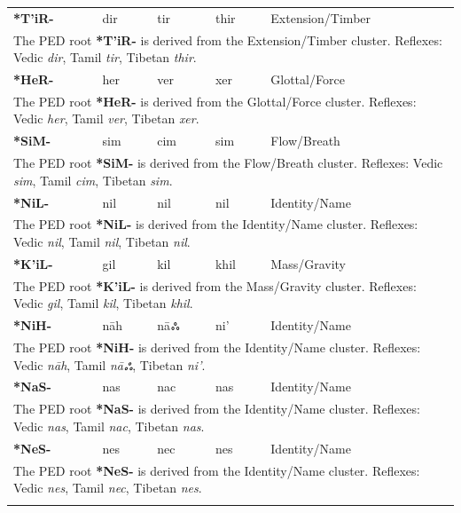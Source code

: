 \begin{longtable}{p{} p{} p{} p{} p{}}
\textbf{*T'iR-} & dir & tir & thir & Extension/Timber \\ 
\multicolumn{5}{p{\textwidth}}{\small The PED root \textbf{*T'iR-} is derived from the Extension/Timber cluster. Reflexes: Vedic \textit{dir}, Tamil \textit{tir}, Tibetan \textit{thir}. } \\ \addlinespace 
\textbf{*HeR-} & her & ver & xer & Glottal/Force \\ 
\multicolumn{5}{p{\textwidth}}{\small The PED root \textbf{*HeR-} is derived from the Glottal/Force cluster. Reflexes: Vedic \textit{her}, Tamil \textit{ver}, Tibetan \textit{xer}. } \\ \addlinespace 
\textbf{*SiM-} & sim & cim & sim & Flow/Breath \\ 
\multicolumn{5}{p{\textwidth}}{\small The PED root \textbf{*SiM-} is derived from the Flow/Breath cluster. Reflexes: Vedic \textit{sim}, Tamil \textit{cim}, Tibetan \textit{sim}. } \\ \addlinespace 
\textbf{*NiL-} & nil & nil & nil & Identity/Name \\ 
\multicolumn{5}{p{\textwidth}}{\small The PED root \textbf{*NiL-} is derived from the Identity/Name cluster. Reflexes: Vedic \textit{nil}, Tamil \textit{nil}, Tibetan \textit{nil}. } \\ \addlinespace 
\textbf{*K'iL-} & gil & kil & khil & Mass/Gravity \\ 
\multicolumn{5}{p{\textwidth}}{\small The PED root \textbf{*K'iL-} is derived from the Mass/Gravity cluster. Reflexes: Vedic \textit{gil}, Tamil \textit{kil}, Tibetan \textit{khil}. } \\ \addlinespace 
\textbf{*NiH-} & nāh & nāஃ & ni' & Identity/Name \\ 
\multicolumn{5}{p{\textwidth}}{\small The PED root \textbf{*NiH-} is derived from the Identity/Name cluster. Reflexes: Vedic \textit{nāh}, Tamil \textit{nāஃ}, Tibetan \textit{ni'}. } \\ \addlinespace 
\textbf{*NaS-} & nas & nac & nas & Identity/Name \\ 
\multicolumn{5}{p{\textwidth}}{\small The PED root \textbf{*NaS-} is derived from the Identity/Name cluster. Reflexes: Vedic \textit{nas}, Tamil \textit{nac}, Tibetan \textit{nas}. } \\ \addlinespace 
\textbf{*NeS-} & nes & nec & nes & Identity/Name \\ 
\multicolumn{5}{p{\textwidth}}{\small The PED root \textbf{*NeS-} is derived from the Identity/Name cluster. Reflexes: Vedic \textit{nes}, Tamil \textit{nec}, Tibetan \textit{nes}. } \\ \addlinespace 

\end{longtable}
